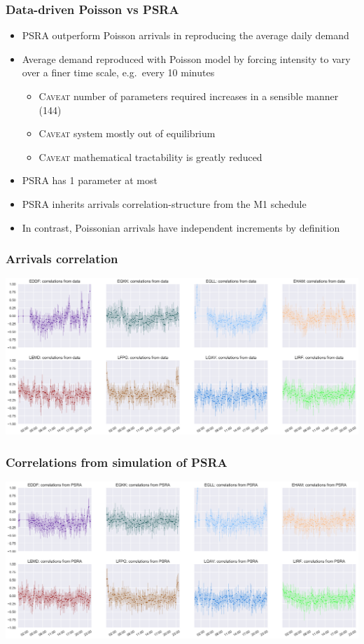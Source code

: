 \documentclass[table,aspectratio=169]{beamer}
\begin{document}
\begin{frame}[t]\frametitle{Data-driven Poisson vs PSRA}
    \begin{itemize}
        \item PSRA outperform Poisson arrivals in reproducing the average daily demand
        \item Average demand reproduced with Poisson model by \alert{forcing}
        intensity to vary over a finer time scale, e.g.\ every 10 minutes
        \begin{itemize}
            \item \alert{\textsc{Caveat}} number of parameters required increases in a sensible manner (144)
            \item \alert{\textsc{Caveat}} system mostly out of equilibrium
            \item \alert{\textsc{Caveat}} mathematical tractability is greatly reduced
        \end{itemize}
        \item PSRA has 1 parameter at most
        \item PSRA inherits \alert{arrivals correlation-structure} from the M1 schedule
        \item In contrast, Poissonian arrivals have \alert{independent increments} by definition
    \end{itemize}
\end{frame}

\begin{frame}[t]\frametitle{Arrivals correlation}
    \centering
    \includegraphics[width=.9\textwidth]{correlations_true}
\end{frame}

\begin{frame}[t]\frametitle{Correlations from simulation of PSRA}
    \centering
    \includegraphics[width=.9\textwidth]{correlations_psra}
\end{frame}
\end{document}
